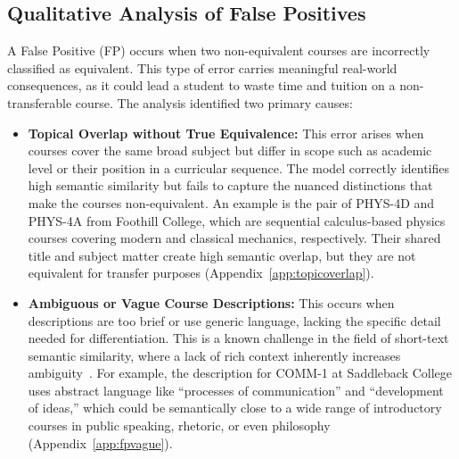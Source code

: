 \subsection{Qualitative Analysis of False Positives}\label{ch:4.6.2}
A False Positive (FP) occurs when two non-equivalent courses are incorrectly classified as equivalent. This type of error carries meaningful real-world consequences, as it could lead a student to waste time and tuition on a non-transferable course. The analysis identified two primary causes:
\begin{itemize}
    \item \textbf{Topical Overlap without True Equivalence:} This error arises when courses cover the same broad subject but differ in scope such as academic level or their position in a curricular sequence. The model correctly identifies high semantic similarity but fails to capture the nuanced distinctions that make the courses non-equivalent. An example is the pair of PHYS-4D and PHYS-4A from Foothill College, which are sequential calculus-based physics courses covering modern and classical mechanics, respectively. Their shared title and subject matter create high semantic overlap, but they are not equivalent for transfer purposes (Appendix~\ref{app:topicoverlap}).
    \item \textbf{Ambiguous or Vague Course Descriptions:} This occurs when descriptions are too brief or use generic language, lacking the specific detail needed for differentiation. This is a known challenge in the field of short-text semantic similarity, where a lack of rich context inherently increases ambiguity~\cite{app13063911}. For example, the description for COMM-1 at Saddleback College uses abstract language like ``processes of communication'' and ``development of ideas,'' which could be semantically close to a wide range of introductory courses in public speaking, rhetoric, or even philosophy (Appendix~\ref{app:fpvague}).
\end{itemize}

